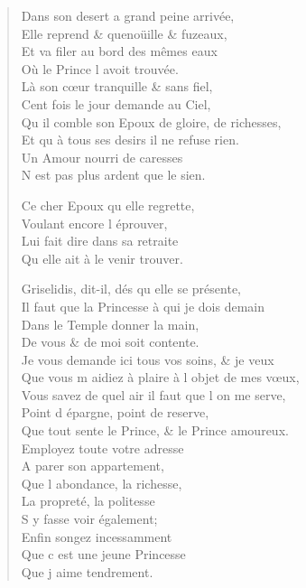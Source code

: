 \begin{verse}
\vin Dans son desert a grand\textquotesingle{} peine arrivée, \\
\vin Elle reprend \& quenoüille \& fuzeaux, \\
\vin Et va filer au bord des mêmes eaux \\
\vin Où le Prince l\textquotesingle{} avoit trouvée. \\
\vin Là son cœur tranquille \& sans fiel, \\
\vin Cent fois le jour demande au Ciel, \\
Qu\textquotesingle{} il comble son Epoux de gloire, de richesses, \\
Et qu\textquotesingle{} à tous ses desirs il ne refuse rien. \\
\vin Un Amour nourri de caresses \\
\vin N\textquotesingle{} est pas plus ardent que le sien.

\vin Ce cher Epoux qu\textquotesingle{} elle regrette, \\
\vin Voulant encore l\textquotesingle{} éprouver, \\
\vin Lui fait dire dans sa retraite \\
\vin Qu\textquotesingle{} elle ait à le venir trouver.

Griselidis, dit-il, dés qu\textquotesingle{} elle se présente, \\
Il faut que la Princesse à qui je dois demain \\
\vin Dans le Temple donner la main, \\
\vin De vous \& de moi soit contente. \\
Je vous demande ici tous vos soins, \& je veux \\
Que vous m\textquotesingle{} aidiez à plaire à l\textquotesingle{} objet de mes vœux, \\
Vous savez de quel air il faut que l\textquotesingle{} on me serve, \\
\vin Point d\textquotesingle{} épargne, point de reserve, \\
Que tout sente le Prince, \& le Prince amoureux. \\
\vin Employez toute votre adresse \\
\vin A parer son appartement, \\
\vin Que l\textquotesingle{} abondance, la richesse, \\
\vin La propreté, la politesse \\
\vin S\textquotesingle{} y fasse voir également; \\
\vin Enfin songez incessamment \\
\vin Que c\textquotesingle{} est une jeune Princesse \\
\vin\vin Que j\textquotesingle{} aime tendrement.


\end{verse}
